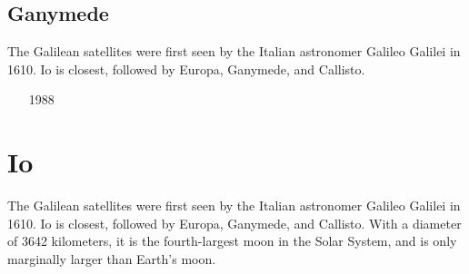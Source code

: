 \subsection{Ganymede}

The Galilean satellites were first seen by the Italian astronomer Galileo Galilei in 1610. 
Io is closest, followed by Europa, Ganymede, and Callisto.

\begin{scriptsize}
\begin{itemize}
\item[1988]
\item[\twothousandsix]
\item[\twothousandfourteen]
\end{itemize}
\end{scriptsize}


\section{Io}

The Galilean satellites were first seen by the Italian astronomer Galileo Galilei in 1610. 
Io is closest, followed by Europa, Ganymede, and Callisto.
With a diameter of 3642 kilometers, it is the fourth-largest moon in the Solar System, 
and is only marginally larger than Earth's moon.

\begin{scriptsize}
\begin{itemize}
\item[\twothousandone]
 \\ 
 \\
\end{itemize}
\end{scriptsize}

